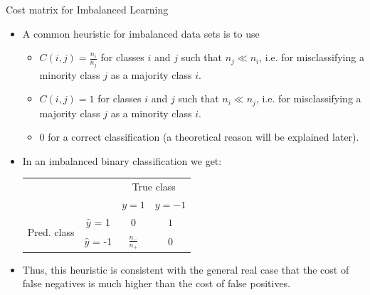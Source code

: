 \documentclass[11pt,compress,t,notes=noshow, xcolor=table]{beamer}
\begin{document}
\begin{vbframe}{Cost matrix for Imbalanced Learning}
	\footnotesize{
		\begin{itemize}			
	 
			\item A common heuristic for imbalanced data sets is to use 
	
			\begin{itemize}
				\footnotesize 
                \item $C(i,j) = \frac{n_i}{n_j}$ for classes $i$ and $j$ such that $n_j  \ll n_i$, i.e. for misclassifying a minority class $j$ as a majority class $i$.
                \vspace{10pt}
		
				\item $C(i,j) = 1$ for classes $i$ and $j$ such that $n_i \ll n_j$, i.e. for misclassifying a majority class $j$ as a minority class $i$.
                \vspace{10pt}
			
				\item 0 for a correct classification (a theoretical reason will be explained later).
                \vspace{10pt}
			
			\end{itemize}

    		\item In an imbalanced binary classification we get: \\
            \begin{table}[]
                \centering
                \begin{tabular}{cc|cc}
                    & &\multicolumn{2}{c}{True class} \\
                    & & $y=1$ & $y=-1$  \\
                    \hline
                    \multirow{2}{*}{\parbox{0.3cm}{Pred.  class}}& $\hat y$ = 1     & $0$                & $ 1 $\\
                    & $\hat y$ = -1 & $ \frac{n_-}{n_+} $              &  $0$   \\
                \end{tabular}
            \end{table}
    		

            \item Thus, this heuristic is consistent with the general real case that the cost of false negatives is much higher than the cost of false positives.	
        \end{itemize}
		
	}
\end{vbframe}
\end{document}
